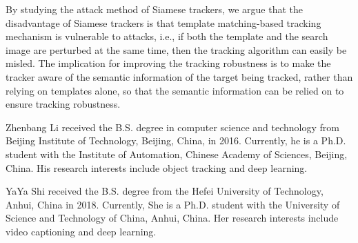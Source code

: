 \documentclass[journal]{IEEEtran}
\begin{document}
By studying the attack method of Siamese trackers, we argue that the disadvantage of Siamese trackers is that template matching-based tracking mechanism is vulnerable to attacks, i.e., if both the template and the search image are perturbed at the same time, then the tracking algorithm can easily be misled.
The implication for improving the tracking robustness is to make the tracker aware of the semantic information of the target being tracked, rather than relying on templates alone, so that the semantic information can be relied on to ensure tracking robustness.

\normalem



\begin{IEEEbiography}
{Zhenbang Li}
received the B.S. degree in computer science and technology from Beijing Institute of Technology, Beijing, China, in 2016. Currently, he is a Ph.D. student with the Institute of Automation, Chinese Academy of Sciences, Beijing, China. His research interests include object tracking and deep learning.
\end{IEEEbiography}

\begin{IEEEbiography}
  {YaYa Shi}
  received the B.S. degree from the Hefei University of Technology, Anhui, China in 2018. Currently, She is a Ph.D. student with the University of Science and Technology of China, Anhui, China. Her research interests include video captioning and deep learning.
\end{IEEEbiography}
\end{document}
